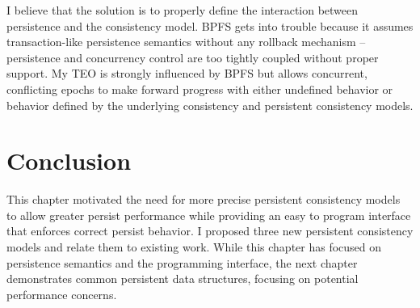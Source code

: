 I believe that the solution is to properly define the interaction between persistence and the consistency model.
BPFS gets into trouble because it assumes transaction-like persistence semantics without any rollback mechanism -- persistence and concurrency control are too tightly coupled without proper support.
My TEO is strongly influenced by BPFS but allows concurrent, conflicting epochs to make forward progress with either undefined behavior or behavior defined by the underlying consistency and persistent consistency models.

\section{Conclusion}
\label{sec:PMC:Conclusion}

This chapter motivated the need for more precise persistent consistency models to allow greater persist performance while providing an easy to program interface that enforces correct persist behavior.
I proposed three new persistent consistency models and relate them to existing work.
While this chapter has focused on persistence semantics and the programming interface, the next chapter demonstrates common persistent data structures, focusing on potential performance concerns.
